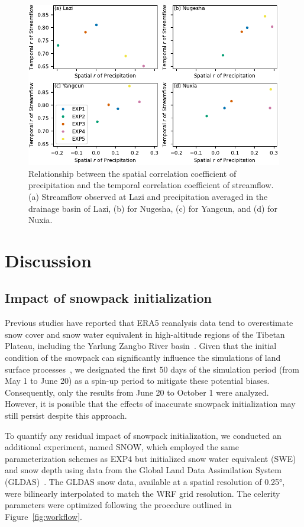 \documentclass[draft]{agujournal2019}
\begin{document}
\begin{figure}[h!]
  \centering
  \noindent\includegraphics[width=140mm]{q_cc_p.pdf}
  \caption{Relationship between the spatial correlation coefficient of precipitation and the temporal correlation coefficient of streamflow. (a) Streamflow observed at Lazi and precipitation averaged in the drainage basin of Lazi, (b) for Nugesha, (c) for Yangcun, and (d) for Nuxia.}\label{fig:q_cc_p}
\end{figure}

\section{Discussion}\label{sec:discussion}

\subsection{Impact of snowpack initialization}

Previous studies have reported that ERA5 reanalysis data tend to overestimate snow cover and snow water equivalent in high-altitude regions of the Tibetan Plateau, including the Yarlung Zangbo River basin~\cite{bian2019JHM}. Given that the initial condition of the snowpack can significantly influence the simulations of land surface processes~\cite{chen2014JGRA}, we designated the first 50 days of the simulation period (from May 1 to June 20) as a spin-up period to mitigate these potential biases. Consequently, only the results from June 20 to October 1 were analyzed. However, it is possible that the effects of inaccurate snowpack initialization may still persist despite this approach.

To quantify any residual impact of snowpack initialization, we conducted an additional experiment, named SNOW, which employed the same parameterization schemes as EXP4 but initialized snow water equivalent (SWE) and snow depth using data from the Global Land Data Assimilation System (GLDAS)~\cite{rodell2004BAMS}. The GLDAS snow data, available at a spatial resolution of 0.25°, were bilinearly interpolated to match the WRF grid resolution. The celerity parameters were optimized following the procedure outlined in Figure~\ref{fig:workflow}.
\end{document}
